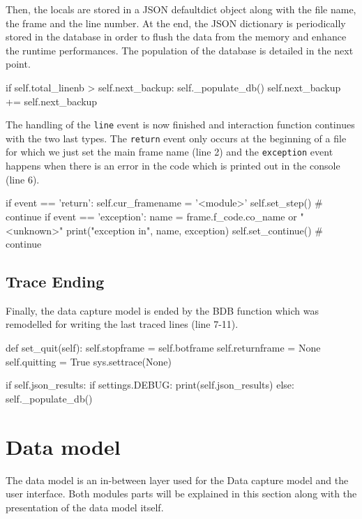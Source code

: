 Then, the locals are stored in a JSON defaultdict object along with the file name, the frame and the line number. At the end, the JSON dictionary is periodically stored in the database in order to flush the data from the memory and enhance the runtime performances. The population of the database is detailed in the next point.

\begin{python}
if self.total_linenb > self.next_backup:
    self._populate_db()
    self.next_backup += self.next_backup
\end{python}

The handling of the \texttt{line} event is now finished and interaction function continues with the two last types. The \texttt{return} event only occurs at the beginning of a file for which we just set the main frame name (line 2) and the \texttt{exception} event happens when there is an error in the code which is printed out in the console (line 6).
\begin{python}
if event == 'return':
    self.cur_framename = '<module>'
    self.set_step()  # continue
if event == 'exception':
    name = frame.f_code.co_name or "<unknown>"
    print("exception in", name, exception)
    self.set_continue()  # continue
\end{python}

\subsection{Trace Ending}

Finally, the data capture model is ended by the  BDB function which was remodelled for writing the last traced lines (line 7-11).
\begin{python}
def set_quit(self):
    self.stopframe = self.botframe
    self.returnframe = None
    self.quitting = True
    sys.settrace(None)

    if self.json_results:
        if settings.DEBUG:
            print(self.json_results)
        else:
            self._populate_db()
\end{python}



\section{Data model}
The data model is an in-between layer used for the Data capture model and the user interface. Both modules parts will be explained in this section along with the presentation of the data model itself.

